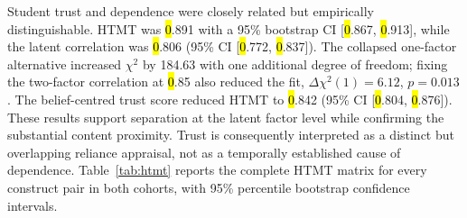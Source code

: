 \documentclass[sustainability,article,accept,moreauthors]{Definitions/mdpi}
\begin{document}
Student trust and dependence were closely related but empirically distinguishable. HTMT was \hl{0}.891 with a 95\% bootstrap CI [\hl{0}.867, \hl{0}.913], while the latent correlation was \hl{0}.806 (95\% CI [\hl{0}.772, \hl{0}.837]). The collapsed one-factor alternative increased $\chi^2$ by 184.63 with one additional degree of freedom; fixing the two-factor correlation at \hl{0}.85 also reduced the fit, $\Delta\chi^2(1)=6.12$, $p=0.013$. The belief-centred trust score reduced HTMT to \hl{0}.842 (95\% CI [\hl{0}.804, \hl{0}.876]). These results support separation at the latent factor level while confirming the substantial content proximity. Trust is consequently interpreted as a distinct but overlapping reliance appraisal, not as a temporally established cause of dependence. Table~\ref{tab:htmt} reports the complete HTMT matrix for every construct pair in both cohorts, with 95\% percentile bootstrap confidence intervals.
\end{document}
